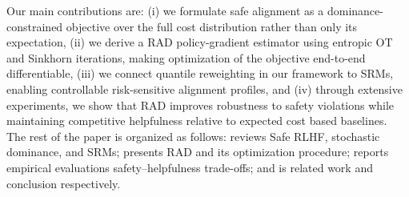 

Our main contributions are: (i) we formulate safe alignment as a dominance-constrained objective over the full cost distribution rather than only its expectation, (ii) we derive a RAD policy-gradient estimator using entropic OT and Sinkhorn iterations, making optimization of the objective end-to-end differentiable, (iii) we connect quantile reweighting in our framework to SRMs, enabling controllable risk-sensitive alignment profiles, and (iv) through extensive experiments, we show that RAD improves robustness to safety violations while maintaining competitive helpfulness relative to expected cost based baselines.  The rest of the paper is organized as follows:  reviews Safe RLHF, stochastic dominance, and SRMs;  presents RAD and its optimization procedure;  reports empirical evaluations safety--helpfulness trade-offs; and  is related work and conclusion respectively.
  
